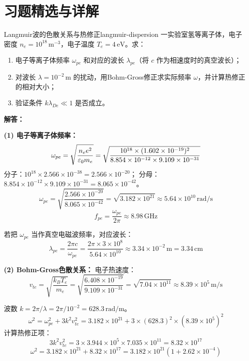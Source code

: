 ﻿%

\section*{习题精选与详解}

\begin{example}{Langmuir波的色散关系与热修正}{langmuir-dispersion}
一实验室氢等离子体，电子密度 $n_e=10^{18}\,\mathrm{m}^{-3}$，电子温度 $T_e=4\,\mathrm{eV}$。求：
\begin{enumerate}[label=(\arabic*)]
\item 电子等离子体频率 $\omega_{pe}$ 和对应的波长 $\lambda_{pe}$（将 $c$ 作为相速度时的真空波长）；
\item 对波长 $\lambda=10^{-2}\,\mathrm{m}$ 的扰动，用Bohm-Gross修正求实际频率 $\omega$，并计算热修正的相对大小；
\item 验证条件 $k\lambda_{De}\ll 1$ 是否成立。
\end{enumerate}
\tcblower
\textbf{解答：}

\textbf{(1) 电子等离子体频率：}
\[
\omega_{pe} = \sqrt{\frac{n_e e^2}{\varepsilon_0 m_e}} = \sqrt{\frac{10^{18}\times (1.602\times 10^{-19})^2}{8.854\times 10^{-12}\times 9.109\times 10^{-31}}}
\]
分子：$10^{18}\times 2.566\times 10^{-38} = 2.566\times 10^{-20}$；
分母：$8.854\times 10^{-12}\times 9.109\times 10^{-31} = 8.065\times 10^{-42}$。
\[
\omega_{pe} = \sqrt{\frac{2.566\times 10^{-20}}{8.065\times 10^{-42}}} = \sqrt{3.182\times 10^{21}} \approx 5.64\times 10^{10}\,\mathrm{rad/s}
\]
\[
f_{pe} = \frac{\omega_{pe}}{2\pi} \approx 8.98\,\mathrm{GHz}
\]

若把 $\omega_{pe}$ 当作真空电磁波频率，对应波长：
\[
\lambda_{pe} = \frac{2\pi c}{\omega_{pe}} = \frac{2\pi\times 3\times 10^8}{5.64\times 10^{10}} \approx 3.34\times 10^{-2}\,\mathrm{m} = 3.34\,\mathrm{cm}
\]

\textbf{(2) Bohm-Gross色散关系：}
电子热速度：
\[
v_{te} = \sqrt{\frac{k_{\!B}T_e}{m_e}} = \sqrt{\frac{6.408\times 10^{-19}}{9.109\times 10^{-31}}} = \sqrt{7.04\times 10^{11}} \approx 8.39\times 10^5\,\mathrm{m/s}
\]

波数 $k=2\pi/\lambda = 2\pi/10^{-2} = 628.3\,\mathrm{rad/m}$。
\[
\omega^2 = \omega_{pe}^2 + 3k^2v_{te}^2 = 3.182\times 10^{21} + 3\times(628.3)^2\times(8.39\times 10^5)^2
\]
计算热修正项：
\[
3k^2v_{te}^2 = 3\times 3.944\times 10^5\times 7.035\times 10^{11} = 8.32\times 10^{17}
\]
\[
\omega^2 = 3.182\times 10^{21} + 8.32\times 10^{17} = 3.182\times 10^{21}\left(1 + 2.62\times 10^{-4}\right)
\]


\end{example}
